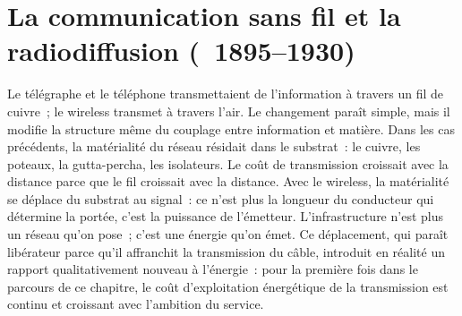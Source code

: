
\section{La communication sans fil et la radiodiffusion (~1895--1930)}\label{sec:wireless}

Le télégraphe et le téléphone transmettaient de l'information à travers un fil de cuivre~; le wireless transmet à travers l'air. Le changement paraît simple, mais il modifie la structure même du couplage entre information et matière. Dans les cas précédents, la matérialité du réseau résidait dans le substrat~: le cuivre, les poteaux, la gutta-percha, les isolateurs. Le coût de transmission croissait avec la distance parce que le fil croissait avec la distance. Avec le wireless, la matérialité se déplace du substrat au signal~: ce n'est plus la longueur du conducteur qui détermine la portée, c'est la puissance de l'émetteur. L'infrastructure n'est plus un réseau qu'on pose~; c'est une énergie qu'on émet. Ce déplacement, qui paraît libérateur parce qu'il affranchit la transmission du câble, introduit en réalité un rapport qualitativement nouveau à l'énergie~: pour la première fois dans le parcours de ce chapitre, le coût d'exploitation énergétique de la transmission est continu et croissant avec l'ambition du service.

